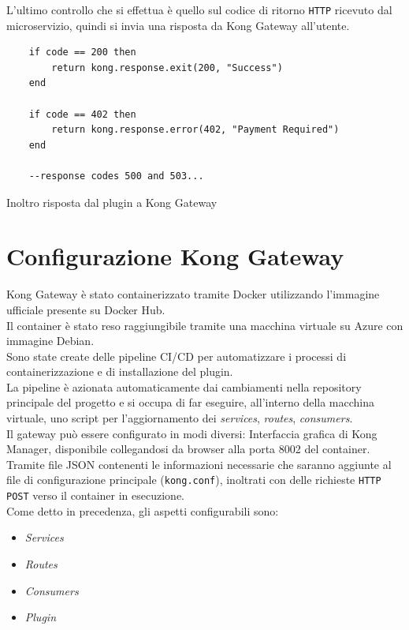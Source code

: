 \newpage
L'ultimo controllo che si effettua è quello sul codice di ritorno \texttt{HTTP} ricevuto dal microservizio, quindi si invia una risposta da Kong Gateway all'utente.

\begin{algorithm}
\centering
\begin{verbatim}
    if code == 200 then
        return kong.response.exit(200, "Success")
    end

    if code == 402 then
        return kong.response.error(402, "Payment Required")
    end

	--response codes 500 and 503...
\end{verbatim}
\caption{Inoltro risposta dal plugin a Kong Gateway}\label{alg:plugingatewayresponse}
\end{algorithm}

\section{Configurazione Kong Gateway}\label{sec:kongconf}
Kong Gateway è stato containerizzato tramite Docker utilizzando l'immagine ufficiale presente su Docker Hub.\\
Il container è stato reso raggiungibile tramite una macchina virtuale su Azure con immagine Debian.\\
Sono state create delle pipeline CI/CD per automatizzare i processi di containerizzazione e di installazione del plugin.\\
La pipeline è azionata automaticamente dai cambiamenti nella repository principale del progetto e si occupa di far eseguire, all'interno della macchina virtuale, uno script per l'aggiornamento dei \emph{services}, \emph{routes}, \emph{consumers}.\\

Il gateway può essere configurato in modi diversi:
Interfaccia grafica di Kong Manager, disponibile collegandosi da browser alla porta 8002 del container.
Tramite file JSON contenenti le informazioni necessarie che saranno aggiunte al file di configurazione principale (\texttt{kong.conf}), inoltrati con delle richieste \texttt{HTTP POST} verso il container in esecuzione.
\\
Come detto in precedenza, gli aspetti configurabili sono:
\begin{itemize}
	\item\emph{Services}
	\item\emph{Routes}
	\item\emph{Consumers}
	\item\emph{Plugin}
\end{itemize}

